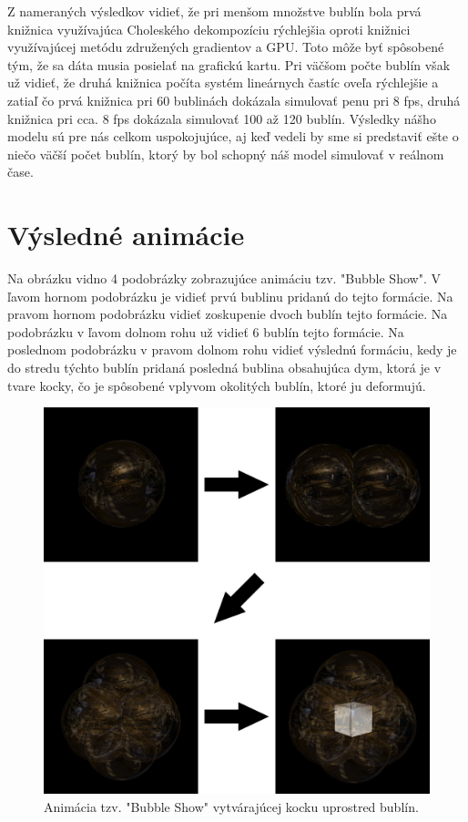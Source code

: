 \noindent Z nameraných výsledkov vidieť, že pri menšom množstve bublín bola prvá knižnica využívajúca Choleského dekompozíciu rýchlejšia oproti knižnici využívajúcej metódu združených gradientov a GPU. Toto môže byť spôsobené tým, že sa dáta musia posielať na grafickú kartu. Pri väčšom počte bublín však už vidieť, že druhá knižnica počíta systém lineárnych častíc oveľa rýchlejšie a zatiaľ čo prvá knižnica pri 60 bublinách dokázala simulovať penu pri 8 fps, druhá knižnica pri cca. 8 fps dokázala simulovať 100 až 120 bublín. Výsledky nášho modelu sú pre nás celkom uspokojujúce, aj keď vedeli by sme si predstaviť ešte o niečo väčší počet bublín, ktorý by bol schopný náš model simulovať v reálnom čase.  

\section{Výsledné animácie}

Na obrázku  vidno 4 podobrázky zobrazujúce animáciu tzv. "Bubble Show". V ľavom hornom podobrázku je vidieť prvú bublinu pridanú do tejto formácie. Na pravom hornom podobrázku vidieť zoskupenie dvoch bublín tejto formácie. Na podobrázku v ľavom dolnom rohu už vidieť 6 bublín tejto formácie. Na poslednom podobrázku v pravom dolnom rohu vidieť výslednú formáciu, kedy je do stredu týchto bublín pridaná posledná bublina obsahujúca dym, ktorá je v tvare kocky, čo je spôsobené vplyvom okolitých bublín, ktoré ju deformujú.
\begin{figure}[H]
	\begin{center}
		\includegraphics[width=\textwidth]{images/bubble_show_1}
		\caption{Animácia tzv. "Bubble Show" vytvárajúcej kocku uprostred bublín.}
		\label{img:bubble_show_1}
	\end{center}
\end{figure}

